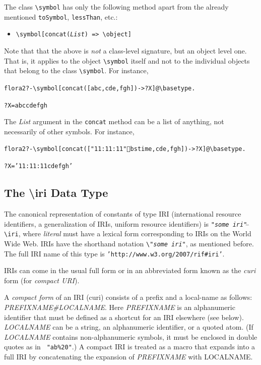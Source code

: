 \documentclass[11pt]{article}
\newcommand{\prompt}{flora2 ?- }
\newcommand{\bs}{\textbackslash}
\begin{document}
The class \texttt{\bs{}symbol} has only the following method apart from the
already mentioned \texttt{toSymbol}, \texttt{lessThan}, etc.:
\begin{itemize}
\item  \texttt{\bs{}symbol[concat(\emph{List}) => \bs{}object]}
\end{itemize}
Note that that the above is \emph{not} a class-level signature, but an
object level one. That is, it applies to the object \texttt{\bs{}symbol}
itself and not to the individual objects that belong to the class
\texttt{\bs{}symbol}.  
For instance,
\begin{alltt}
\prompt \bs{}symbol[concat([abc,cde,fgh])->?X]@\bs{}basetype.

?X = abccdefgh
\end{alltt}
The \emph{List} argument in the \texttt{concat} method can be a list of anything,
not necessarily of other symbols. For instance,
\begin{alltt}
\prompt \bs{}symbol[concat(["11:11:11"^^\bs{}time,cde,fgh])->?X]@\bs{}basetype.

?X = '11:11:11cdefgh'
\end{alltt}

\subsection{The \bs{}iri Data Type}\label{sec-uri}

\index{datatype!\bs{}iri}
The canonical representation of constants of type IRI (international
resource identifiers, a generalization of IRIs, uniform resource
identifiers) is
{\tt "\emph{some iri}"$\hat{~}\hat{~}$\bs{}iri}, where \emph{literal} must have
a lexical form corresponding to IRIs on the World Wide Web. IRIs have the shorthand notation
{\tt \bs{}"\emph{some iri}"}, as mentioned before. The full IRI name of this
type is {\tt 'http://www.w3.org/2007/rif\#iri'}. 


IRIs can come in the usual full form or in an abbreviated form
known as the \emph{curi} form (for \emph{compact URI}).  

\index{\#}
A \emph{compact form} of an IRI (curi) consists of a
prefix and a local-name as follows: \emph{PREFIXNAME\#LOCALNAME}. Here
\emph{PREFIXNAME} is an alphanumeric identifier that must be defined as a
shortcut for an IRI elsewhere (see below). \emph{LOCALNAME} can be a string,
an alphanumeric identifier, or a quoted atom. (If \emph{LOCALNAME} contains
non-alphanumeric symbols, it must be enclosed in double quotes as in {\tt
  "ab\%20"}.) A compact IRI is treated as a macro that expands into a full IRI
by concatenating the expansion of \emph{PREFIXNAME}
with LOCALNAME.
\end{document}
